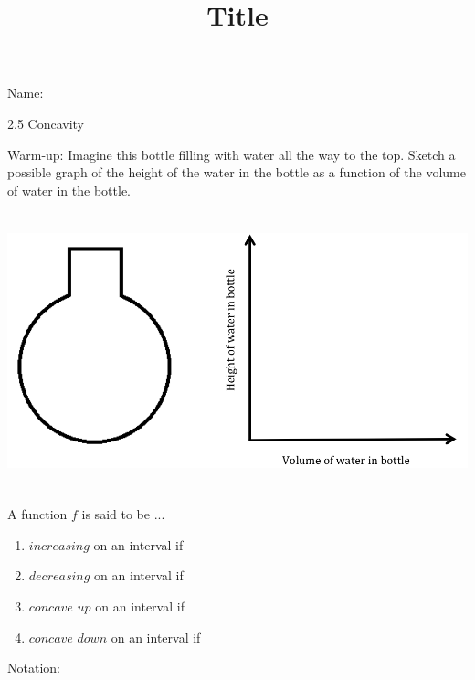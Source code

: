 \documentclass[12pt]{article}
\title{Title}
\begin{document}
 Name:
 \begin{center}\large{2.5 Concavity}\end{center}

Warm-up: Imagine this bottle filling with water all the way to the top. Sketch a possible graph of the height of the water in the bottle as a function of the volume of water in the bottle.

\includegraphics [height=80mm, width=160mm]{bottle}
\vfill
\begin{tcolorbox}
A function $f$ is said to be ...
\begin{enumerate}
\item $increasing$ on an interval if \\
\vspace{2mm}
\item $decreasing$ on an interval if \\

\vspace{2mm}
\item $concave$ $up$ on an interval if \\
\vspace{2mm}
\item $concave$ $down$ on an interval if \\
\vspace{2mm}
\end{enumerate}
Notation:
\vspace{10mm}\\


\end{tcolorbox}
\newpage
{}
~
\end{document}
